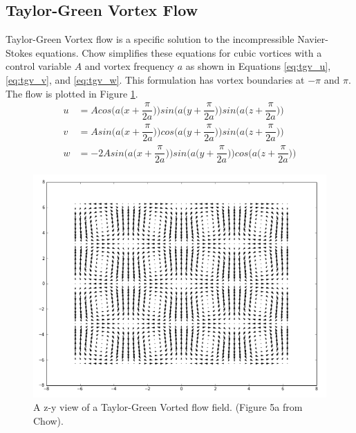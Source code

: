 \documentclass[a4paper,11pt,titlepage]{report}
\begin{document}
\subsection{Taylor-Green Vortex Flow}
\label{sec:tgv flow}
Taylor-Green Vortex flow is a specific solution to the incompressible Navier-Stokes equations. Chow\cite{achow} simplifies these equations for cubic vortices with a control variable $A$ and vortex frequency $a$ as shown in Equations \ref{eq:tgv_u}, \ref{eq:tgv_v}, and \ref{eq:tgv_w}. This formulation has vortex boundaries at $-\pi$ and $\pi$. The flow is plotted in Figure \ref{fig:tgv_plot}.
\begin{align}
u &= A cos\Big(a\Big(x + \dfrac{\pi}{2a}\Big)\Big)sin\Big(a\Big(y + \dfrac{\pi}{2a}\Big)\Big)sin\Big(a\Big(z + \dfrac{\pi}{2a}\Big)\Big) \label{eq:tgv_u}\\
v &= A sin\Big(a\Big(x + \dfrac{\pi}{2a}\Big)\Big)cos\Big(a\Big(y + \dfrac{\pi}{2a}\Big)\Big)sin\Big(a\Big(z + \dfrac{\pi}{2a}\Big)\Big) \label{eq:tgv_v}\\
w &= -2A sin\Big(a\Big(x + \dfrac{\pi}{2a}\Big)\Big)sin\Big(a\Big(y + \dfrac{\pi}{2a}\Big)\Big)cos\Big(a\Big(z + \dfrac{\pi}{2a}\Big)\Big) \label{eq:tgv_w}
\end{align}
\begin{figure}[!htb]
\centering
\includegraphics[scale=0.65]{figures/tgv_plot.png}
\caption{A z-y view of a Taylor-Green Vorted flow field. (Figure 5a from Chow\cite{achow}).}
\label{fig:tgv_plot}
\end{figure}
\end{document}
